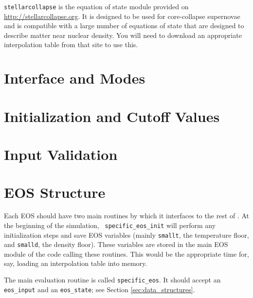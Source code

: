 {\tt stellarcollapse} is the equation of state module provided
  on \url{http://stellarcollapse.org}. It is designed
  to be used for core-collapse supernovae and is compatible with a
  large number of equations of state that are designed to describe
  matter near nuclear density. You will need to download an
  appropriate interpolation table from that site to use this.


\section{Interface and Modes}

\section{Initialization and Cutoff Values}


\section{Input Validation}


\section{EOS Structure}

Each EOS should have two main routines by which it interfaces to the
rest of \castro.  At the beginning of the simulation, {\tt
  specific\_eos\_init} will perform any initialization steps and save
EOS variables (mainly \texttt{smallt}, the temperature floor, and
\texttt{smalld}, the density floor). These variables are stored in the
main EOS module of the code calling these routines. This would be the
appropriate time for, say, loading an interpolation table into memory.

The main evaluation routine is called {\tt specific\_eos}. It should
accept an {\tt eos\_input} and an {\tt eos\_state}; see Section
\ref{sec:data_structures}.
